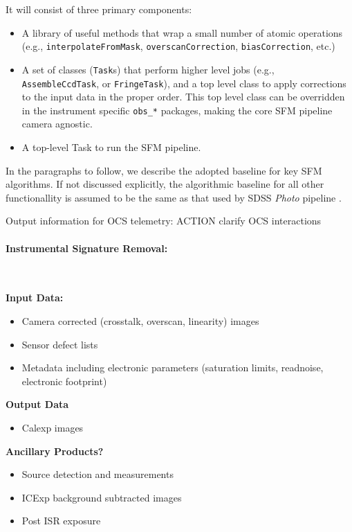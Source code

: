 It will consist of three primary components:
%
\begin{itemize}
\item A library of useful methods that wrap a small number of atomic operations (e.g., {\tt interpolateFromMask}, {\tt overscanCorrection}, {\tt biasCorrection}, etc.) %
\item A set of classes ({\tt Task}s) that perform higher level jobs
    (e.g., {\tt AssembleCcdTask}, or {\tt FringeTask}), and a top level class to apply corrections to the input data in the proper order. This top level class can be overridden in the instrument specific {\tt obs\_*} packages, making the core SFM pipeline camera agnostic.
\item A top-level Task to run the SFM pipeline.
\end{itemize}

In the paragraphs to follow, we describe the adopted baseline for key SFM algorithms. If not discussed explicitly, the algorithmic baseline for all other functionallity is assumed to be the same as that used by SDSS \emph{Photo} pipeline \cite{LuptonPhoto}.

Output information for OCS telemetry: ACTION clarify OCS interactions

\paragraph{Instrumental Signature Removal:}~

\noindent
{\bf Input Data:}\\
\begin{itemize}
\item Camera corrected (crosstalk, overscan, linearity) images
\item Sensor defect lists
\item Metadata including electronic parameters (saturation limits, readnoise, electronic
  footprint)
\end{itemize}

\noindent
{\bf Output Data}\\
\begin{itemize}
\item Calexp images
\end{itemize}

{\bf Ancillary Products?}\\
\begin{itemize}
\item Source detection and measurements
\item ICExp background subtracted images
\item Post ISR exposure
\end{itemize}

